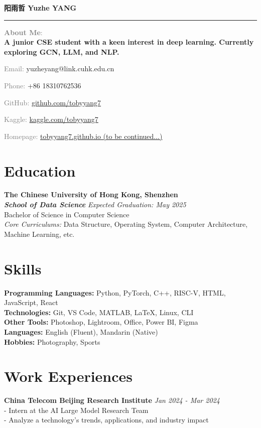 \documentclass[a4paper,10pt]{article}
\newcommand{\name}[1]{\noindent\textbf{\LARGE #1}\vspace{0.5em}\hrule\vspace{1em}}
\newcommand{\contact}[2]{\noindent\textcolor{gray}{#1:} #2\par}
\begin{document}
\name{阳雨哲 Yuzhe YANG}

\contact{\textbf{About Me}}{\textbf{\\A junior CSE student with a keen interest in deep learning. Currently exploring GCN, LLM, and NLP.}}
\contact{Email}{yuzheyang@link.cuhk.edu.cn}
\contact{Phone}{+86 18310762536}
\contact{GitHub}{\href{https://github.com/tobyyang7}{github.com/tobyyang7}}
\contact{Kaggle}{\href{https://www.kaggle.com/tobyyang7}{kaggle.com/tobyyang7}}
\contact{Homepage}{\href{https://tobyyang7.github.io/}{tobyyang7.github.io  (to be continued...)}}

\section*{Education}
\textbf{The Chinese University of Hong Kong, Shenzhen\\ \textit{School of Data Science}} \hfill \textit{Expected Graduation: May 2025}\\
Bachelor of Science in Computer Science\\
\textit{Core Curriculums:} Data Structure, Operating System, Computer Architecture, Machine Learning, etc.


\section*{Skills}
\textbf{Programming Languages:} Python, PyTorch, C++, RISC-V, HTML, JavaScript, React\\
\textbf{Technologies:} Git, VS Code, MATLAB, \LaTeX, Linux, CLI\\
\textbf{Other Tools:} Photoshop, Lightroom, Office, Power BI, Figma\\
\textbf{Languages:} English (Fluent), Mandarin (Native)\\
\textbf{Hobbies:} Photography, Sports

\section*{Work Experiences}
\textbf{China Telecom Beijing Research Institute} \hfill \textit{Jan 2024 - Mar 2024}\\
- Intern at the AI Large Model Research Team\\
- Analyze a technology's trends, applications, and industry impact
\end{document}
